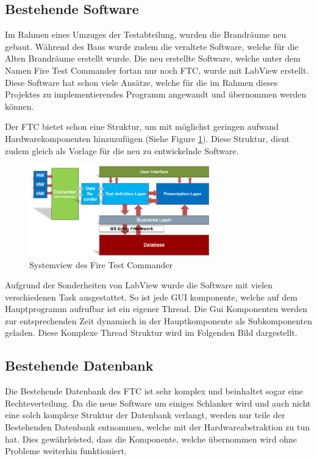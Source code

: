 \documentclass[10pt]{scrartcl}
\begin{document}
\subsection{Bestehende Software}
Im Rahmen eines Umzuges der Testabteilung, wurden die Brandräume neu gebaut. Während des Baus wurde zudem die veraltete Software, welche für die Alten Brandräume erstellt wurde. Die neu erstellte Software, welche unter dem Namen Fire Test Commander fortan nur noch FTC, wurde mit LabView erstellt. Diese Software hat schon viele Ansätze, welche für die im Rahmen dieses Projektes zu implementierendes Programm angewandt und übernommen werden können.

\newpage
Der FTC bietet schon eine Struktur, um mit möglichst geringen aufwand Hardwarekomponenten hinzuzufügen (Siehe Figure \ref{fig:SystemViewFTC}). Diese Struktur, dient zudem gleich als Vorlage für die neu zu entwickelnde Software.
\begin{figure}[htbp] 
	\centering
	\includegraphics[width=0.7\textwidth]{SystemviewFTC}
	\caption{Systemview des Fire Test Commander}
	\label{fig:SystemViewFTC}
\end{figure}
Aufgrund der Sonderheiten von LabView wurde die Software mit vielen verschiedenen Task ausgestattet. So ist jede GUI komponente, welche auf dem Hauptprogramm aufrufbar ist ein eigener Thread. Die Gui Komponenten werden zur entsprechenden Zeit dynamisch in der Hauptkomponente als Subkomponenten geladen. Diese Komplexe Thread Struktur wird im Folgenden Bild dargestellt.

\subsection{Bestehende Datenbank}
Die Bestehende Datenbank des FTC ist sehr komplex und beinhaltet sogar eine Rechteverteilung. Da die neue Software um einiges Schlanker wird und auch nicht eine solch komplexe Struktur der Datenbank verlangt, werden nur teile der Bestehenden Datenbank entnommen, welche mit der Hardwareabstraktion zu tun hat. Dies gewährleisted, dass die Komponente, welche übernommen wird ohne Probleme weiterhin funktioniert. 
\end{document}
